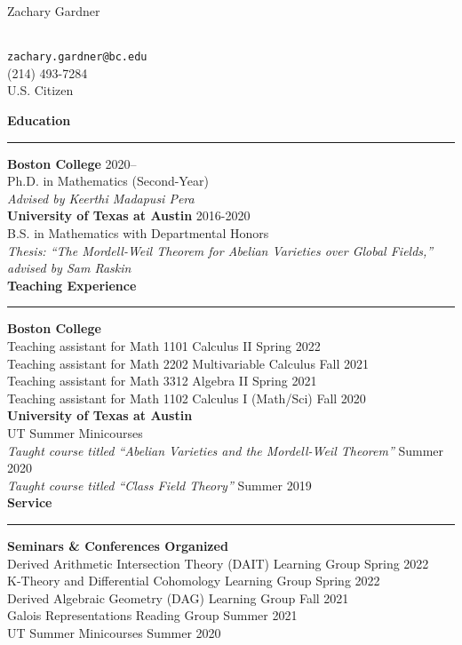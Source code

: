 \documentclass[11pt]{article}
\newenvironment{mysection}{
\color{mygreen}\bfseries\large
}
{
\\ \rule{\textwidth}{1pt}\hspace{-.25em}
} %
\begin{document}
\begin{center}
\begin{LARGE}Zachary Gardner\end{LARGE} \\
\vspace{1em}
\texttt{zachary.gardner@bc.edu} \\
(214) 493-7284 \\
U.S. Citizen \\
\end{center}

\begin{mysection}Education\end{mysection}
\textbf{Boston College} \hfill 2020-- \\
Ph.D. in Mathematics (Second-Year) \\
\textit{Advised by Keerthi Madapusi Pera} \\

\textbf{University of Texas at Austin} \hfill 2016-2020 \\
B.S. in Mathematics with Departmental Honors \\
\textit{Thesis: ``The Mordell-Weil Theorem for Abelian Varieties over Global Fields,'' advised by Sam Raskin} \\

\begin{mysection}Teaching Experience\end{mysection}
\textbf{Boston College} \\
Teaching assistant for Math 1101 Calculus II \hfill Spring 2022 \\
Teaching assistant for Math 2202 Multivariable Calculus \hfill Fall 2021 \\
Teaching assistant for Math 3312 Algebra II \hfill Spring 2021 \\
Teaching assistant for Math 1102 Calculus I (Math/Sci) \hfill Fall 2020 \\

\textbf{University of Texas at Austin} \\
UT Summer Minicourses \\
\textit{Taught course titled ``Abelian Varieties and the Mordell-Weil Theorem''} \hfill Summer 2020 \\
\textit{Taught course titled ``Class Field Theory''} \hfill Summer 2019 \\

\begin{mysection}Service \end{mysection}
\textbf{Seminars \& Conferences Organized} \\
Derived Arithmetic Intersection Theory (DAIT) Learning Group \hfill Spring 2022 \\
K-Theory and Differential Cohomology Learning Group \hfill Spring 2022 \\
Derived Algebraic Geometry (DAG) Learning Group \hfill Fall 2021 \\
Galois Representations Reading Group \hfill Summer 2021 \\
UT Summer Minicourses \hfill Summer 2020 \\
\end{document}
